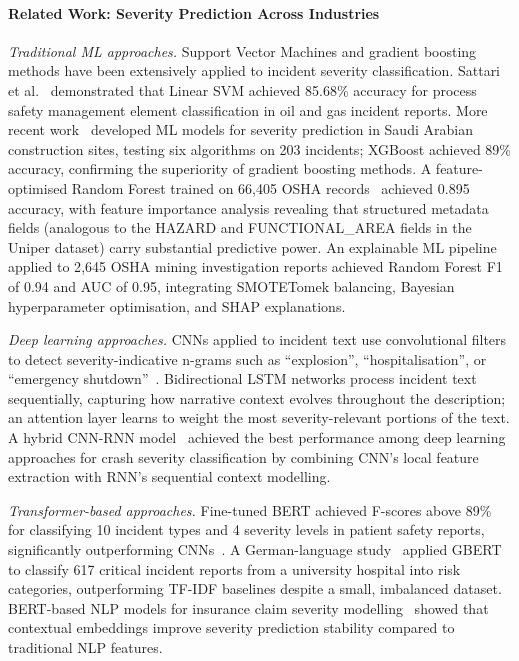 \documentclass[11pt, titlepage, bibliography=totoc]{scrreprt}
\begin{document}
\paragraph{Related Work: Severity Prediction Across Industries}

\textit{Traditional ML approaches.}
Support Vector Machines and gradient boosting methods have been extensively applied to incident severity classification. Sattari et al.~\cite{sattari2021} demonstrated that Linear SVM achieved 85.68\% accuracy for process safety management element classification in oil and gas incident reports. More recent work~\cite{SR2025} developed ML models for severity prediction in Saudi Arabian construction sites, testing six algorithms on 203 incidents; XGBoost achieved 89\% accuracy, confirming the superiority of gradient boosting methods. A feature-optimised Random Forest trained on 66{,}405 OSHA records~\cite{PMC2022} achieved 0.895 accuracy, with feature importance analysis revealing that structured metadata fields (analogous to the HAZARD and FUNCTIONAL\_AREA fields in the Uniper dataset) carry substantial predictive power. An explainable ML pipeline~\cite{SD2025} applied to 2{,}645 OSHA mining investigation reports achieved Random Forest F1 of 0.94 and AUC of 0.95, integrating SMOTETomek balancing, Bayesian hyperparameter optimisation, and SHAP explanations.

\textit{Deep learning approaches.}
CNNs applied to incident text use convolutional filters to detect severity-indicative n-grams such as ``explosion'', ``hospitalisation'', or ``emergency shutdown''~\cite{wang2025bert}. Bidirectional LSTM networks process incident text sequentially, capturing how narrative context evolves throughout the description; an attention layer learns to weight the most severity-relevant portions of the text. A hybrid CNN-RNN model~\cite{ArXiv2024} achieved the best performance among deep learning approaches for crash severity classification by combining CNN's local feature extraction with RNN's sequential context modelling.

\textit{Transformer-based approaches.}
Fine-tuned BERT achieved F-scores above 89\% for classifying 10 incident types and 4 severity levels in patient safety reports, significantly outperforming CNNs~\cite{wang2025bert}. A German-language study~\cite{MDPI2025} applied GBERT to classify 617 critical incident reports from a university hospital into risk categories, outperforming TF-IDF baselines despite a small, imbalanced dataset. BERT-based NLP models for insurance claim severity modelling~\cite{Variance2023} showed that contextual embeddings improve severity prediction stability compared to traditional NLP features.
\end{document}

